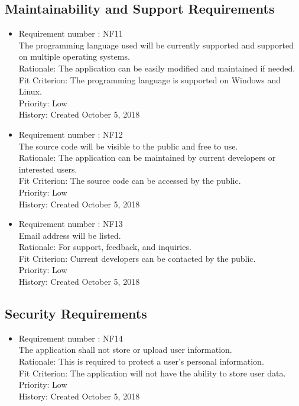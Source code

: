 \documentclass[12pt, titlepage]{article}
\begin{document}
\subsection{Maintainability and Support Requirements}
\begin{itemize}
\item Requirement number : NF11\\
The programming language used will be currently supported and supported on multiple operating systems.\\
Rationale: The application can be easily modified and maintained if needed.\\
Fit Criterion: The programming language is supported on Windows and Linux.\\
Priority: Low\\
History: Created October 5, 2018
\item Requirement number : NF12\\
The source code will be visible to the public and free to use.\\
Rationale: The application can be maintained by current developers or interested users.\\
Fit Criterion: The source code can be accessed by the public.\\
Priority: Low\\
History: Created October 5, 2018
\item Requirement number : NF13\\
Email address will be listed.\\
Rationale: For support, feedback, and inquiries.\\ 
Fit Criterion: Current developers can be contacted by the public.\\
Priority: Low\\
History: Created October 5, 2018

\end{itemize}
\subsection{Security Requirements}
\begin{itemize}
\item Requirement number : NF14\\
The application shall not store or upload user information.\\
Rationale: This is required to protect a user's personal information.\\
Fit Criterion: The application will not have the ability to store user data.\\
Priority: Low\\
History: Created October 5, 2018
\end{itemize}
\end{document}
